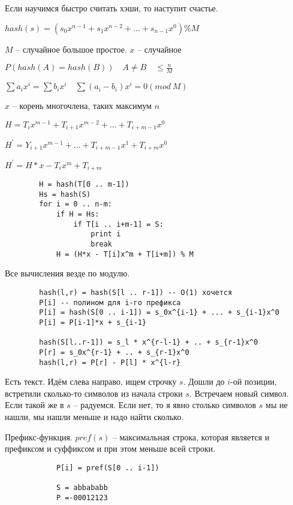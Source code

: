 \documentclass{book}
\newcommand{\p}[1]{#1^{\prime}}
\theoremstyle{definition}
\begin{document}
    Если научимся быстро считать хэши, то наступит счастье.

    $hash(s) = (s_0 x^{n-1} + s_1 x^{n-2} + \ldots + s_{n-1}x^0)\%M$

    $M$ -- случайное большое простое.  $x$ -- случайное

    $P(hash(A) = hash(B))\quad A \neq B\quad \leqslant \frac{n}{M}$

    $\sum a_ix^i = \sum b_i x^i\quad \sum (a_i - b_i)x^i = 0 (mod\ M)$ 

    $x$ -- корень многочлена, таких максимум $n$

    $H = T_ix^{m-1} + T_{i+1}x^{m-2} + \ldots + T_{i+m-1}x^0$

    $\p H = Y_{i+1}x^{m-1} + \ldots + T_{i+m-1}x^1 + T_{i+m}x^0$

    $\p H = H * x - T_i x^m + T_{i + m}$

     \begin{lstlisting}
        H = hash(T[0 .. m-1])
        Hs = hash(S)
        for i = 0 .. n-m:
            if H = Hs:
                if T[i .. i+m-1] = S:
                    print i
                    break
            H = (H*x - T[i]x^m + T[i+m]) % M
    \end{lstlisting}

    Все вычисления везде по модулю.
    \begin{lstlisting}
        hash(l,r) = hash(S[l .. r-1]) -- O(1) хочется
        P[i] -- полином для i-го префикса
        P[i] = hash(S[0 .. i-1]) = s_0x^{i-1} + ... + s_{i-1}x^0
        P[i] = P[i-1]*x + s_{i-1}

        hash(S[l..r-1]) = s_l * x^{r-l-1} + .. + s_{r-1}x^0
        P[r] = s_0x^{r-1} + .. + s_{r-1}x^0
        hash(l,r) = P[r] - P[l] * x^{l-r}
    \end{lstlisting}

    \begin{theorem}

        Есть текст. Идём слева направо, ищем строчку $s$. Дошли до  $i$-ой позиции, встретили сколько-то символов из начала строки  $s$. Встречаем новый символ. Если такой же в  $s$ -- радуемся. Если нет, то я явно столько символов  $s$ мы не нашли, мы нашли меньше и надо найти сколько. 

        Префикс-функция. $pref(s)$ -- максимальная строка, которая является и префиксом и суффиксом и при этом меньше всей строки.

         \begin{lstlisting}
            P[i] = pref(S[0 .. i-1])

            S = abbababb
            P =-00012123
        \end{lstlisting}
    \end{theorem}
\end{document}
